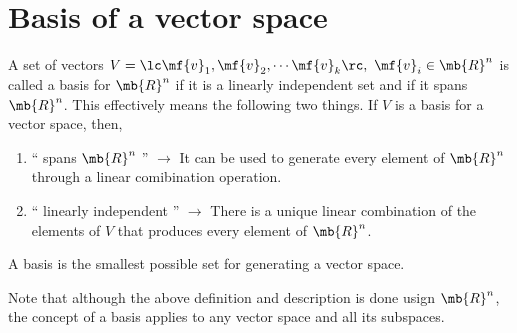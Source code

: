 \section{Basis of a vector space}
A set of vectors $V = \lc \mf{v}_1, \mf{v}_2,  \cdots \mf{v}_k \rc, \,\, \mf{v}_i \in \mb{R}^n$ is called a basis for $\mb{R}^n$ if it is a linearly independent set and if it spans $\mb{R}^n$. This effectively means the following two things. If $V$ is a basis for a vector space, then,
\begin{enumerate}
    \item `` spans $\mb{R}^n$ '' $\longrightarrow$ It can be used to generate every element of $\mb{R}^n$ through a linear comibination operation.
    \item `` linearly independent '' $\longrightarrow$ There is a unique linear combination of the elements of $V$ that produces every element of $\mb{R}^n$.
\end{enumerate}
A basis is the smallest possible set for generating a vector space. 

Note that although the above definition and description is done usign $\mb{R}^n$, the concept of a basis applies to any vector space and all its subspaces.

